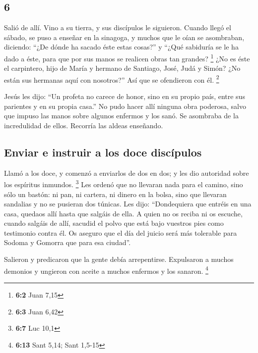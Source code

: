 \begin{paracol}{2}
\hypertarget{section-10}{%
\section{6}\label{section-10}}

 Salió de allí. Vino a su tierra, y sus discípulos le
siguieron.  Cuando llegó el sábado, se puso a enseñar en
la sinagoga, y muchos que le oían se asombraban, diciendo: ``¿De dónde
ha sacado éste estas cosas?'' y ``¿Qué sabiduría se le ha dado a éste,
para que por sus manos se realicen obras tan grandes? \footnote{\textbf{6:2}
  Juan 7,15}  ¿No es éste el carpintero, hijo de María y
hermano de Santiago, José, Judá y Simón? ¿No están sus hermanas aquí con
nosotros?'' Así que se ofendieron con él. \footnote{\textbf{6:3} Juan
  6,42}

 Jesús les dijo: ``Un profeta no carece de honor, sino en
su propio país, entre sus parientes y en su propia casa.''
 No pudo hacer allí ninguna obra poderosa, salvo que
impuso las manos sobre algunos enfermos y los sanó.  Se
asombraba de la incredulidad de ellos. Recorría las aldeas enseñando.

\hypertarget{enviar-e-instruir-a-los-doce-discuxedpulos}{%
\subsection{Enviar e instruir a los doce
discípulos}\label{enviar-e-instruir-a-los-doce-discuxedpulos}}

 Llamó a los doce, y comenzó a enviarlos de dos en dos; y
les dio autoridad sobre los espíritus inmundos. \footnote{\textbf{6:7}
  Luc 10,1}  Les ordenó que no llevaran nada para el
camino, sino sólo un bastón: ni pan, ni cartera, ni dinero en la bolsa,
 sino que llevaran sandalias y no se pusieran dos túnicas.
 Les dijo: ``Dondequiera que entréis en una casa, quedaos
allí hasta que salgáis de ella.  A quien no os reciba ni
os escuche, cuando salgáis de allí, sacudid el polvo que está bajo
vuestros pies como testimonio contra él. Os aseguro que el día del
juicio será más tolerable para Sodoma y Gomorra que para esa ciudad''.

 Salieron y predicaron que la gente debía arrepentirse.
 Expulsaron a muchos demonios y ungieron con aceite a
muchos enfermos y los sanaron. \footnote{\textbf{6:13} Sant 5,14; Sant
  1,5-15}


\end{paracol}
